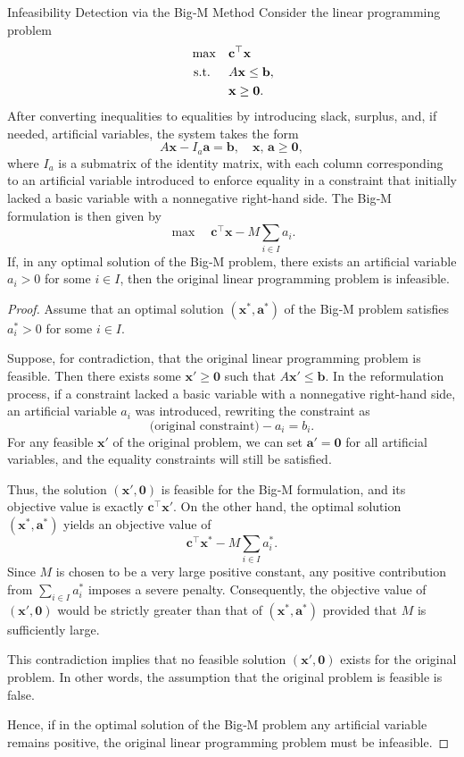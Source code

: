 \begin{theorem}{Infeasibility Detection via the Big‑M Method}{}
Consider the linear programming problem
\[
\begin{aligned}
\max\quad & \mathbf{c}^\top \mathbf{x} \\
\mbox{ s.t. }\quad & A\mathbf{x} \le \mathbf{b}, \\
& \mathbf{x} \ge \mathbf{0}.
\end{aligned}
\]
After converting inequalities to equalities by introducing slack, surplus, and, if needed, artificial variables, the system takes the form
\[
A\mathbf{x} - I_a \mathbf{a} = \mathbf{b},\quad \mathbf{x},\, \mathbf{a} \ge \mathbf{0},
\]
where \( I_a \) is a submatrix of the identity matrix, with each column corresponding to an artificial variable introduced to enforce equality in a constraint that initially lacked a basic variable with a nonnegative right-hand side. The Big‑M formulation is then given by
\[
\max\quad \mathbf{c}^\top \mathbf{x} - M\sum_{i\in I} a_i.
\]
If, in any optimal solution of the Big‑M problem, there exists an artificial variable \(a_i > 0\) for some \(i\in I\), then the original linear programming problem is infeasible.
\end{theorem}

\begin{proof}
Assume that an optimal solution \((\mathbf{x}^*,\mathbf{a}^*)\) of the Big‑M problem satisfies \(a_i^* > 0\) for some \(i\in I\).

Suppose, for contradiction, that the original linear programming problem is feasible. Then there exists some \(\mathbf{x}'\ge \mathbf{0}\) such that \(A\mathbf{x}' \le \mathbf{b}\). In the reformulation process, if a constraint lacked a basic variable with a nonnegative right-hand side, an artificial variable \(a_i\) was introduced, rewriting the constraint as
\[
\text{(original constraint)} - a_i = b_i.
\]
For any feasible \(\mathbf{x}'\) of the original problem, we can set \(\mathbf{a}' = \mathbf{0}\) for all artificial variables, and the equality constraints will still be satisfied.

Thus, the solution \((\mathbf{x}',\mathbf{0})\) is feasible for the Big‑M formulation, and its objective value is exactly \(\mathbf{c}^\top \mathbf{x}'\). On the other hand, the optimal solution \((\mathbf{x}^*,\mathbf{a}^*)\) yields an objective value of 
\[
\mathbf{c}^\top \mathbf{x}^* - M\sum_{i\in I}a_i^*.
\]
Since \(M\) is chosen to be a very large positive constant, any positive contribution from \(\sum_{i\in I}a_i^*\) imposes a severe penalty. Consequently, the objective value of \((\mathbf{x}',\mathbf{0})\) would be strictly greater than that of \((\mathbf{x}^*,\mathbf{a}^*)\) provided that \(M\) is sufficiently large.

This contradiction implies that no feasible solution \((\mathbf{x}',\mathbf{0})\) exists for the original problem. In other words, the assumption that the original problem is feasible is false.

Hence, if in the optimal solution of the Big‑M problem any artificial variable remains positive, the original linear programming problem must be infeasible.
\end{proof}

